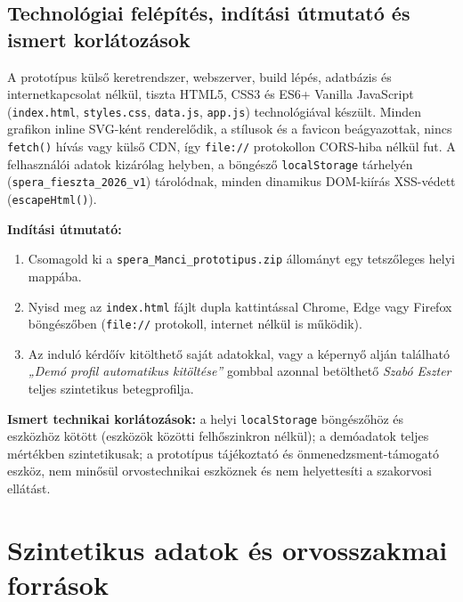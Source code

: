 \documentclass[10pt,a4paper]{article}
\begin{document}
\subsection{Technológiai felépítés, indítási útmutató és ismert korlátozások}
A prototípus külső keretrendszer, webszerver, build lépés, adatbázis és internetkapcsolat nélkül, tiszta HTML5, CSS3 és ES6+ Vanilla JavaScript (\texttt{index.html}, \texttt{styles.css}, \texttt{data.js}, \texttt{app.js}) technológiával készült. Minden grafikon inline SVG-ként renderelődik, a stílusok és a favicon beágyazottak, nincs \texttt{fetch()} hívás vagy külső CDN, így \texttt{file://} protokollon CORS-hiba nélkül fut. A felhasználói adatok kizárólag helyben, a böngésző \texttt{localStorage} tárhelyén (\texttt{spera\_fieszta\_2026\_v1}) tárolódnak, minden dinamikus DOM-kiírás XSS-védett (\texttt{escapeHtml()}).

\textbf{Indítási útmutató:}
\begin{enumerate}
  \item Csomagold ki a \texttt{spera\_Manci\_prototipus.zip} állományt egy tetszőleges helyi mappába.
  \item Nyisd meg az \texttt{index.html} fájlt dupla kattintással Chrome, Edge vagy Firefox böngészőben (\texttt{file://} protokoll, internet nélkül is működik).
  \item Az induló kérdőív kitölthető saját adatokkal, vagy a képernyő alján található \textit{„Demó profil automatikus kitöltése”} gombbal azonnal betölthető \textit{Szabó Eszter} teljes szintetikus betegprofilja.
\end{enumerate}

\textbf{Ismert technikai korlátozások:} a helyi \texttt{localStorage} böngészőhöz és eszközhöz kötött (eszközök közötti felhőszinkron nélkül); a demóadatok teljes mértékben szintetikusak; a prototípus tájékoztató és önmenedzsment-támogató eszköz, nem minősül orvostechnikai eszköznek és nem helyettesíti a szakorvosi ellátást.

\section{Szintetikus adatok és orvosszakmai források}
\end{document}
